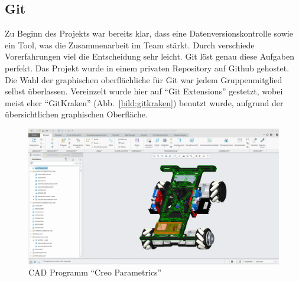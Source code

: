 \subsection{Git}
Zu Beginn des Projekts war bereits klar, dass eine Datenversionskontrolle sowie ein Tool, was die Zusammenarbeit im Team stärkt.
Durch verschiede Vorerfahrungen viel die Entscheidung sehr leicht. Git löst genau diese Aufgaben perfekt. Das Projekt wurde in einem privaten Repository auf Github gehostet. 
Die Wahl der graphischen oberflächliche für Git war jedem Gruppenmitglied selbst überlassen. Vereinzelt wurde hier auf ``Git Extensions'' gestetzt, wobei meist eher ``GitKraken'' (Abb.~\ref{bild:gitkraken}) benutzt wurde, aufgrund der übersichtlichen graphischen Oberfläche.
\begin{figure}[!ht]
	\centering
	\includegraphics[width=\textwidth]{bilder/CreoParametrics.png}
	\caption{CAD Programm ``Creo Parametrics''}
	\label{bild:creo}
\end{figure}

